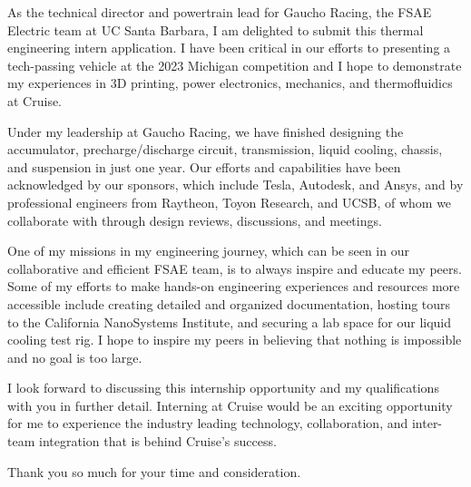 \documentclass[11pt, letterpaper]{awesome-cv} %
\begin{document}
\makecvheader %

\makelettertitle %


\begin{cvletter}

As the technical director and powertrain lead for Gaucho Racing, the FSAE Electric team at UC Santa Barbara, I am delighted to submit this thermal engineering intern application. I have been critical in our efforts to presenting a tech-passing vehicle at the 2023 Michigan competition and I hope to demonstrate my experiences in 3D printing, power electronics, mechanics, and thermofluidics at Cruise. 

Under my leadership at Gaucho Racing, we have finished designing the accumulator, precharge/discharge circuit, transmission, liquid cooling, chassis, and suspension in just one year. Our efforts and capabilities have been acknowledged by our sponsors, which include Tesla, Autodesk, and Ansys, and by professional engineers from Raytheon, Toyon Research, and UCSB, of whom we collaborate with through design reviews, discussions, and meetings. 

One of my missions in my engineering journey, which can be seen in our collaborative and efficient FSAE team, is to always inspire and educate my peers. Some of my efforts to make hands-on engineering experiences and resources more accessible include creating detailed and organized documentation, hosting tours to the California NanoSystems Institute, and securing a lab space for our liquid cooling test rig. I hope to inspire my peers in believing that nothing is impossible and no goal is too large.

I look forward to discussing this internship opportunity and my qualifications with you in further detail. Interning at Cruise would be an exciting opportunity for me to experience the industry leading technology, collaboration, and inter-team integration that is behind Cruise's success. 

Thank you so much for your time and consideration.



\end{cvletter}


\makeletterclosing %
\end{document}
